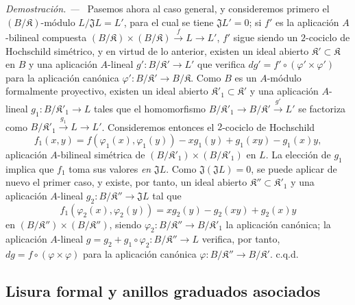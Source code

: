 \documentclass[10pt,oneside]{book}
\newenvironment{proof}{%
  \par\medskip\noindent\textit{Demostración. ---\ }}{\par}
\providecommand{\setmin}{-}%
\begin{document}
\begin{proof}
Pasemos ahora al caso general, y consideremos primero el
$(B/\mathfrak K)$-módulo $L/\mathfrak JL=L'$, para el cual se tiene
$\mathfrak JL'=0$; si $f'$ es la aplicación $A$-bilineal compuesta
$(B/\mathfrak K)\times(B/\mathfrak K)\xrightarrow{f}L\to L'$, $f'$ sigue
siendo un $2$-cociclo de Hochschild simétrico, y en virtud de lo anterior,
existen un ideal abierto $\mathfrak K'\subset\mathfrak K$ en $B$ y
una aplicación $A$-lineal $g':B/\mathfrak K'\to L'$ que verifica
$dg'=f'\circ(\varphi'\times\varphi')$ para la aplicación canónica
$\varphi':B/\mathfrak K'\to B/\mathfrak K$. Como $B$ es un
$A$-módulo formalmente proyectivo, existen un ideal abierto
$\mathfrak K'_1\subset\mathfrak K'$ y una aplicación $A$-lineal
$g_1:B/\mathfrak K'_1\to L$ tales que el homomorfismo
$B/\mathfrak K'_1\to B/\mathfrak K'\xrightarrow{g'}L'$ se factoriza como
$B/\mathfrak K'_1\xrightarrow{g_1}L\to L'$. Consideremos entonces el
$2$-cociclo de Hochschild
\[
  f_1(x,y)=f(\varphi_1(x),\varphi_1(y))\setmin xg_1(y)+g_1(xy)\setmin g_1(x)y,
\]
aplicación $A$-bilineal simétrica de
$(B/\mathfrak K'_1)\times(B/\mathfrak K'_1)$ en $L$. La elección de
$g_1$ implica que $f_1$ toma sus valores \emph{en} $\mathfrak JL$. Como
$\mathfrak J(\mathfrak JL)=0$, se puede aplicar de nuevo el primer caso,
y existe, por tanto, un ideal abierto
$\mathfrak K''\subset\mathfrak K'_1$ y una aplicación $A$-lineal
$g_2:B/\mathfrak K''\to\mathfrak JL$ tal que
\[
  f_1(\varphi_2(x),\varphi_2(y))=xg_2(y)\setmin g_2(xy)+g_2(x)y
\]
en $(B/\mathfrak K'')\times(B/\mathfrak K'')$,
siendo $\varphi_2:B/\mathfrak K''\to B/\mathfrak K'_1$ la aplicación
canónica; la aplicación $A$-lineal
$g=g_2+g_1\circ\varphi_2:B/\mathfrak K''\to L$ verifica, por tanto,
$dg=f\circ(\varphi\times\varphi)$ para la aplicación canónica
$\varphi:B/\mathfrak K''\to B/\mathfrak K'$. c.q.d.
\end{proof}

\subsection{Lisura formal y anillos graduados asociados}
\label{subsection:0.19.5-es}
\end{document}
